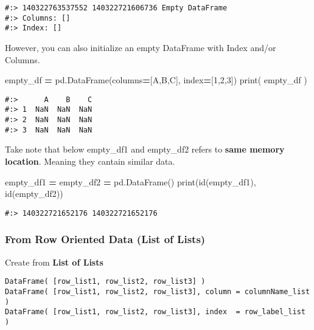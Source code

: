 \documentclass[
]{book}
\newenvironment{Shaded}{\begin{snugshade}}{\end{snugshade}}
\newcommand{\BuiltInTok}[1]{#1}
\newcommand{\DecValTok}[1]{\textcolor[rgb]{0.06,0.06,0.06}{#1}}
\newcommand{\NormalTok}[1]{#1}
\newcommand{\OperatorTok}[1]{\textcolor[rgb]{0.43,0.43,0.43}{\textbf{#1}}}
\newcommand{\StringTok}[1]{\textcolor[rgb]{0.5,0.5,0.5}{#1}}
\begin{document}
\begin{verbatim}
#:> 140322763537552 140322721606736 Empty DataFrame
#:> Columns: []
#:> Index: []
\end{verbatim}

However, you can also initialize an empty DataFrame with Index and/or Columns.

\begin{Shaded}
\begin{Highlighting}[]
\NormalTok{empty\_df }\OperatorTok{=}\NormalTok{ pd.DataFrame(columns}\OperatorTok{=}\NormalTok{[}\StringTok{\textquotesingle{}A\textquotesingle{}}\NormalTok{,}\StringTok{\textquotesingle{}B\textquotesingle{}}\NormalTok{,}\StringTok{\textquotesingle{}C\textquotesingle{}}\NormalTok{], index}\OperatorTok{=}\NormalTok{[}\DecValTok{1}\NormalTok{,}\DecValTok{2}\NormalTok{,}\DecValTok{3}\NormalTok{])}
\BuiltInTok{print}\NormalTok{( empty\_df )}
\end{Highlighting}
\end{Shaded}

\begin{verbatim}
#:>      A    B    C
#:> 1  NaN  NaN  NaN
#:> 2  NaN  NaN  NaN
#:> 3  NaN  NaN  NaN
\end{verbatim}

Take note that below empty\_df1 and empty\_df2 refers to \textbf{same memory location}. Meaning they cantain similar data.

\begin{Shaded}
\begin{Highlighting}[]
\NormalTok{empty\_df1 }\OperatorTok{=}\NormalTok{ empty\_df2 }\OperatorTok{=}\NormalTok{ pd.DataFrame()}
\BuiltInTok{print}\NormalTok{(}\BuiltInTok{id}\NormalTok{(empty\_df1), }\BuiltInTok{id}\NormalTok{(empty\_df2))}
\end{Highlighting}
\end{Shaded}

\begin{verbatim}
#:> 140322721652176 140322721652176
\end{verbatim}

\hypertarget{from-row-oriented-data-list-of-lists}{%
\subsubsection{From Row Oriented Data (List of Lists)}\label{from-row-oriented-data-list-of-lists}}

Create from \textbf{List of Lists}

\begin{verbatim}
DataFrame( [row_list1, row_list2, row_list3] )
DataFrame( [row_list1, row_list2, row_list3], column = columnName_list )
DataFrame( [row_list1, row_list2, row_list3], index  = row_label_list )
\end{verbatim}
\end{document}
